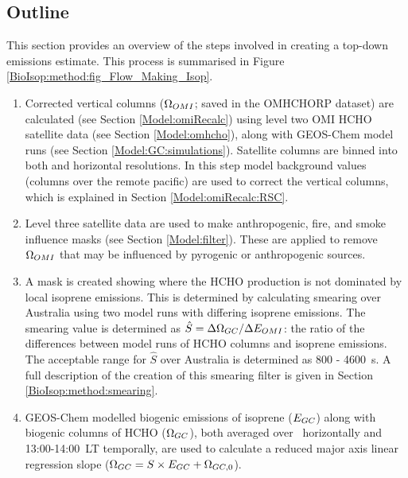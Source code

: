   \subsection{Outline}
    \label{BioIsop:method:outline}
    This section provides an overview of the steps involved in creating a top-down emissions estimate. %
    This process is summarised in Figure \ref{BioIsop:method:fig_Flow_Making_Isop}.
    \begin{enumerate}
      \item 
        Corrected vertical columns ($\Omega_{OMI}$; saved in the OMHCHORP dataset) are calculated (see Section \ref{Model:omiRecalc}) using level two OMI HCHO satellite data (see Section \ref{Model:omhcho}), along with GEOS-Chem model runs (see Section \ref{Model:GC:simulations}).
        Satellite columns are binned into both \highhr and \lowhr horizontal resolutions.
        In this step model background values (columns over the remote pacific) are used to correct the vertical columns, which is explained in Section \ref{Model:omiRecalc:RSC}.
      \item 
        Level three satellite data are used to make anthropogenic, fire, and smoke influence masks (see Section \ref{Model:filter}).
        These are applied to remove $\Omega_{OMI}$ that may be influenced by pyrogenic or anthropogenic sources. 
      \item
        A mask is created showing where the HCHO production is not dominated by local isoprene emissions. 
        This is determined by calculating smearing over Australia using two model runs with differing isoprene emissions.
        The smearing value is determined as $\hat{S}=\Delta \Omega_{GC}/ \Delta E_{OMI}$: the ratio of the differences between model runs of HCHO columns and isoprene emissions.
        The acceptable range for $\hat{S}$ over Australia is determined as 800 - 4600~s.
        A full description of the creation of this smearing filter is given in Section \ref{BioIsop:method:smearing}.
      \item 
        GEOS-Chem modelled biogenic emissions of isoprene ($E_{GC}$) along with biogenic columns of HCHO ($\Omega_{GC}$), both averaged over \lowhr ~horizontally and 13:00-14:00~LT temporally, are used to calculate a reduced major axis linear regression slope ($\Omega_{GC}=S \times E_{GC} + \Omega_{GC,0}$).

\end{enumerate}
